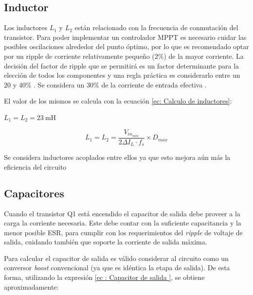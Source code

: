         
  
        \subsection{Inductor}
        
            Los inductores $L_1$ y $L_2$ están relacionado con la frecuencia de conmutación del transistor. Para poder implementar un controlador MPPT es necesario cuidar las posibles oscilaciones alrededor del punto óptimo, por lo que es recomendado optar por un ripple de corriente relativamente pequeño \cite{atia2009photovoltaic} ($2\%$) de la mayor corriente. La decisión del factor de ripple que se permitirá es un factor determinante para la elección de todos los componentes y una regla práctica es considerarlo entre un $20$ y $40\% $ \cite{falin2008designing}. Se considera un $30\%$ de la corriente de entrada efectiva \cite{kaouane2015design}. 
            
            El valor de los mismos se calcula con la ecuación \ref{ec: Calculo de inductores}: 
            
            $L_1 = L_2 =23~\mathrm{mH}$
            
            \begin{equation}
                L_1 = L_2 = \frac{V_{in_{min}}}{2\Delta I_L \cdot f_s} \times D_{max} 
                \label{ec: Calculo de inductores}
            \end{equation}
            
            Se considera inductores acoplados entre ellos ya que esto mejora aún más la eficiencia del circuito \cite{rios2017sistema}
    
        \subsection{Capacitores}
            
            Cuando el transistor Q1 está encendido el capacitor de salida debe proveer a la carga la corriente necesaria. Este debe contar con la suficiente capacitancia y la menor posible ESR, para cumplir con los requerimientos del \textit{ripple} de voltaje de salida, cuidando también que soporte la corriente de salida máxima. 
            
            Para calcular el capacitor de salida es válido considerar al circuito como un conversor \textit{boost} convencional (ya que es idéntica la etapa de salida). De esta forma, utilizando la expresión \ref{ec : Capacitor de salida }\cite{falin2008designing}, se obtiene aproximadamente: 
            
